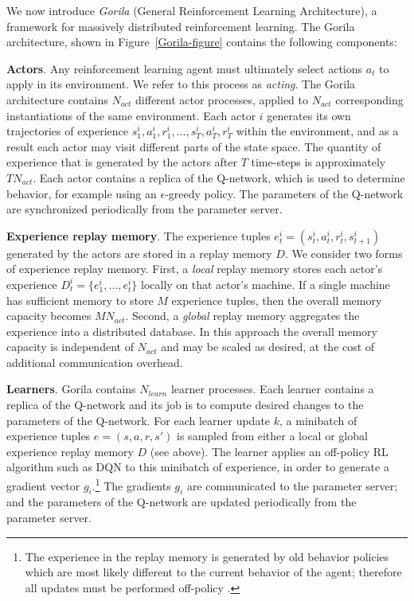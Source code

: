 We now introduce \emph{Gorila} (General Reinforcement Learning Architecture), a framework for massively distributed reinforcement learning. The Gorila architecture, shown in Figure~\ref{Gorila-figure} contains the following components:

{\bf Actors}. Any reinforcement learning agent must ultimately select actions $a_t$ to apply in its environment. We refer to this process as \emph{acting}. The Gorila architecture contains $N_{act}$ different actor processes, applied to $N_{act}$ corresponding instantiations of the same environment. Each actor $i$ generates its own trajectories of experience $s^i_1, a^i_1, r^i_1, ..., s^i_T, a^i_T, r^i_T$ within the environment, and as a result each actor may visit different parts of the state space. The quantity of experience that is generated by the actors after $T$ time-steps is approximately $TN_{act}$. Each actor contains a replica of the Q-network, which is used to determine behavior, for example using an $\epsilon$-greedy policy. The parameters of the Q-network are synchronized periodically from the parameter server.

{\bf Experience replay memory}. The experience tuples $e^i_t = (s^i_t, a^i_t, r^i_t, s^i_{t+1})$ generated by the actors are stored in a replay memory $D$. We consider two forms of experience replay memory. First, a \emph{local} replay memory stores each actor's experience $D^i_t =  \{ e^i_1, ..., e^i_t \}$ locally on that actor's machine. If a single machine has sufficient memory to store $M$ experience tuples, then the overall memory capacity becomes $MN_{act}$. Second, a \emph{global} replay memory aggregates the experience into a distributed database. In this approach the overall memory capacity is independent of $N_{act}$ and may be scaled as desired, at the cost of additional communication overhead.

{\bf Learners}. Gorila contains $N_{learn}$ learner processes. Each learner contains a replica of the Q-network and its job is to compute desired changes to the parameters of the Q-network. For each learner update $k$, a minibatch of experience tuples $e = (s,a,r,s')$ is sampled from either a local or global experience replay memory $D$ (see above). The learner applies an off-policy RL algorithm such as DQN \cite{mnih2013atari} to this minibatch of experience, in order to generate a gradient vector $g_i$.\footnote{The experience in the replay memory is generated by old behavior policies which are most likely different to the current behavior of the agent; therefore all updates must be performed off-policy \cite{sutton:book}.} The gradients $g_i$ are communicated to the parameter server; and the parameters of the Q-network are updated periodically from the parameter server. 

